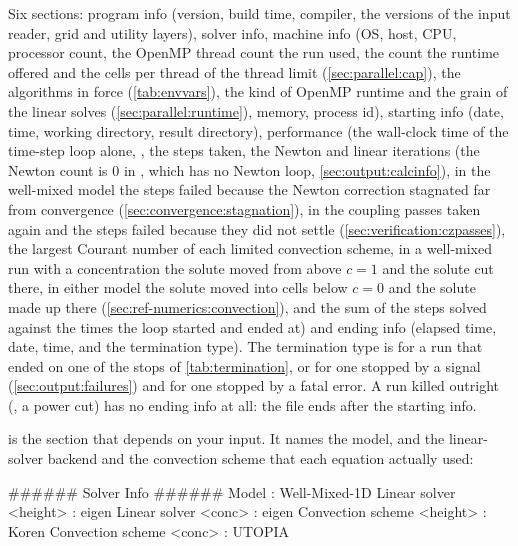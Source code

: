 Six sections: program info (version, build time, compiler, the versions of the
input reader, grid and utility layers), solver info, machine info (OS, host,
CPU, processor count, the OpenMP thread count  the run
used, the count the runtime offered  and the
cells per thread of the thread limit 
(\cref{sec:parallel:cap}), the algorithms in force 
(\cref{tab:envvars}), the kind of OpenMP runtime  and the
grain of the linear solves  (\cref{sec:parallel:runtime}),
memory, process id), starting
info (date, time, working directory, result directory), performance (the
wall-clock time of the time-step loop alone, , the steps
taken, the Newton and linear iterations (the Newton count is 0 in ,
which has no Newton loop, \cref{sec:output:calcinfo}), in the well-mixed model the steps
failed because the Newton correction stagnated far from convergence
(\cref{sec:convergence:stagnation}), in  the coupling passes
taken again and the steps failed because they did not settle
(\cref{sec:verification:czpasses}), the largest Courant number of each
limited convection scheme, in a well-mixed run with a concentration the
solute moved from above $c = 1$ and the solute cut there, in either model
the solute moved into cells below $c = 0$ and the solute made up there
(\cref{sec:ref-numerics:convection}), and the sum of the steps solved
against the times the loop started and ended at) and ending info (elapsed
time, date, time, and the termination type). The termination type is
 for a run that ended on one of the stops of
\cref{tab:termination},  or
 for one stopped by a signal
(\cref{sec:output:failures}) and  for one stopped by a fatal
error. A run killed outright (, a power cut) has no ending info
at all: the file ends after the starting info.

 is the section that depends on
your input. It names the model, and the linear-solver backend and the
convection scheme that each equation actually used:

\begin{plain}
###### Solver Info ######
Model :                      Well-Mixed-1D
Linear solver <height> :     eigen
Linear solver <conc> :       eigen
Convection scheme <height> : Koren
Convection scheme <conc> :   UTOPIA
\end{plain}

